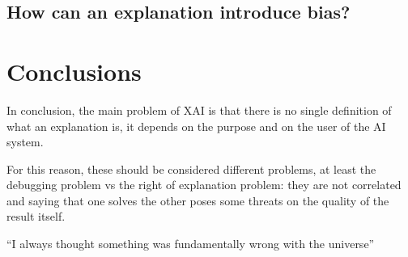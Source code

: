 \documentclass[conference]{IEEEtran}
\begin{document}
\subsection{How can an explanation introduce bias?}
\label{sec:bias}


\section{Conclusions}
\label{sec:conclusions}

In conclusion, the main problem of XAI is that there is no single definition of
what an explanation is, it depends on the purpose and on the user of the AI
system.

For this reason, these should be considered different problems, at least the
debugging problem vs the right of explanation problem: they are not correlated
and saying that one solves the other poses some threats on the quality of the
result itself.

``I always thought something was fundamentally wrong with the universe''

\citep{adams1995hitchhiker}



\end{document}
